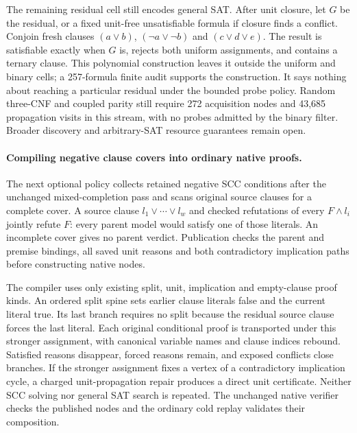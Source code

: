 \documentclass[11pt,a4paper]{article}
\numberwithin{equation}{section}
\theoremstyle{plain}
\theoremstyle{definition}
\theoremstyle{remark}
\begin{document}
The remaining residual cell still encodes general SAT. After unit closure,
let $G$ be the residual, or a fixed unit-free unsatisfiable formula if closure
finds a conflict. Conjoin fresh clauses $(a\lor b)$,
$(\neg a\lor\neg b)$ and $(c\lor d\lor e)$. The result is satisfiable exactly
when $G$ is, rejects both uniform assignments, and contains a ternary clause.
This polynomial construction leaves it outside the uniform and binary cells;
a 257-formula finite audit supports the construction. It says nothing about
reaching a particular residual under the bounded probe policy. Random
three-CNF and coupled parity still require 272 acquisition nodes and 43,685
propagation visits in this stream, with no probes admitted by the binary
filter. Broader discovery and arbitrary-SAT resource guarantees remain open.

\paragraph{Compiling negative clause covers into ordinary native proofs.}
The next optional policy collects retained negative SCC conditions after the
unchanged mixed-completion pass and scans original source clauses for a complete
cover. A source clause $l_1\lor\cdots\lor l_w$ and checked refutations of
every $F\land l_i$ jointly refute $F$: every parent model would satisfy one
of those literals. An incomplete cover gives no parent verdict. Publication
checks the parent and premise bindings, all saved unit reasons and both
contradictory implication paths before constructing native nodes.

The compiler uses only existing split, unit, implication and empty-clause proof
kinds. An ordered split spine sets earlier clause literals false and the
current literal true. Its last branch requires no split because the residual
source clause forces the last literal. Each original conditional proof is
transported under this stronger assignment, with canonical variable names and
clause indices rebound. Satisfied reasons disappear, forced reasons remain,
and exposed conflicts close branches. If the stronger assignment fixes a
vertex of a contradictory implication cycle, a charged unit-propagation
repair produces a direct unit certificate. Neither SCC solving nor general
SAT search is repeated. The unchanged native verifier checks the published
nodes and the ordinary cold replay validates their composition.
\end{document}

